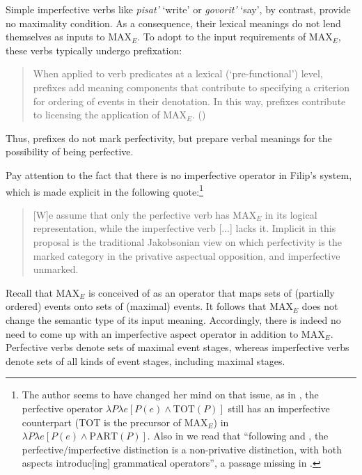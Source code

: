 \documentclass[output=paper,colorlinks,citecolor=brown]{langscibook}
\begin{document}
Simple imperfective verbs like \textit{pisat'} `write' or \textit{govorit'} `say', by contrast, provide no maximality condition. As a consequence, their lexical meanings do not lend themselves as inputs to MAX$_E$. To adopt to the input requirements of MAX$_E$, these verbs typically undergo prefixation: 

\begin{quote}
    When applied to verb predicates at a lexical (`pre-functional') level, prefixes add meaning components that contribute to specifying a criterion for ordering of events in their denotation. In this way, prefixes contribute to licensing the application of MAX$_E$. (\citealt[244]{Filip2008}) 
\end{quote}
Thus, prefixes do not mark perfectivity, but prepare verbal meanings for the possibility of being perfective. 

Pay attention to the fact that there is no imperfective operator in Filip's system, which is made explicit in the following quote:\footnote{The author seems to have changed her mind on that issue, as in \citet{Filip2000}, the perfective operator $\lambda P \lambda e [P(e) \wedge \text{TOT}(P)]$ 
still has an imperfective counterpart (TOT is the precursor of MAX$_E$) in $\lambda P \lambda e [P(e) \wedge \text{PART}(P)]$.
Also in \citet[12]{BragRoth2005} we read that ``following \cite{Filip2000} and \cite{FilipRothstein2006}, the perfective/imperfective distinction is a non-privative distinction, with both aspects introduc[ing] grammatical operators'', a passage missing in \citet{BragRoth2008}.}
\begin{quote}
[W]e assume that only the perfective verb has MAX$_E$ in its logical representation, while the imperfective verb [...] lacks it. Implicit in this proposal is the traditional Jakobsonian view on which perfectivity is the marked category in the privative aspectual opposition, and imperfective unmarked. 
\citep[247]{Filip2008}
\end{quote}
Recall that 
MAX$_E$ is conceived of as an operator that maps sets of (partially ordered) events onto sets of (maximal) events. It follows that MAX$_E$ does not change the semantic type of its input meaning. 
Accordingly, there is indeed no need to come up with an imperfective aspect operator in addition to MAX$_E$. 
Perfective verbs denote sets of maximal event stages, whereas imperfective verbs denote sets of all kinds of event stages, including maximal stages. 
\end{document}
